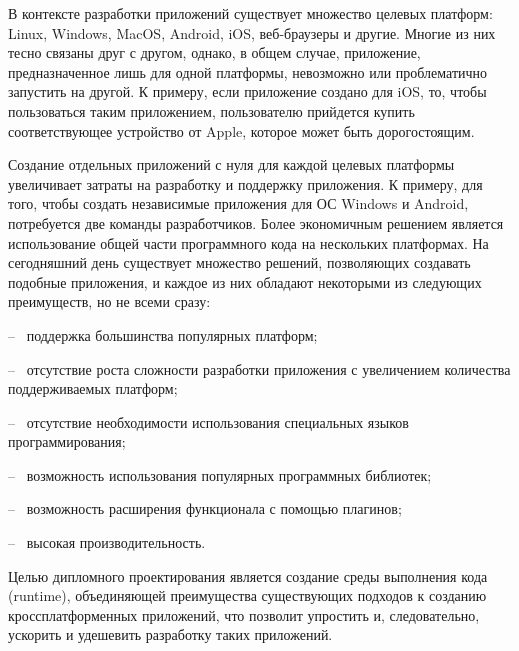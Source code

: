 В контексте разработки приложений существует множество целевых платформ: Linux, Windows, MacOS, Android, iOS, веб-браузеры и другие.
Многие из них тесно связаны друг с другом, однако, в общем случае, приложение, предназначенное лишь для одной платформы, невозможно или проблематично запустить на другой.
К примеру, если приложение создано для iOS, то, чтобы пользоваться таким приложением, пользователю прийдется купить соответствующее устройство от Apple, которое может быть дорогостоящим.

Создание отдельных приложений с нуля для каждой целевых платформы увеличивает затраты на разработку и поддержку приложения. 
К примеру, для того, чтобы создать независимые приложения для ОС Windows и Android, потребуется две команды разработчиков.
Более экономичным решением является использование общей части программного кода на нескольких платформах.
На сегодняшний день существует множество решений, позволяющих создавать подобные приложения, и каждое из них обладают некоторыми из следующих преимуществ, но не всеми сразу:

-- ~поддержка большинства популярных платформ;

-- ~отсутствие роста сложности разработки приложения с увеличением количества поддерживаемых платформ;

-- ~отсутствие необходимости использования специальных языков программирования;

-- ~возможность использования популярных программных библиотек;

-- ~возможность расширения функционала с помощью плагинов;

-- ~высокая производительность.

Целью дипломного проектирования является создание среды выполнения кода (runtime), объединяющей преимущества существующих подходов к созданию кроссплатформенных приложений, что позволит упростить и, следовательно, ускорить и удешевить разработку таких приложений.
